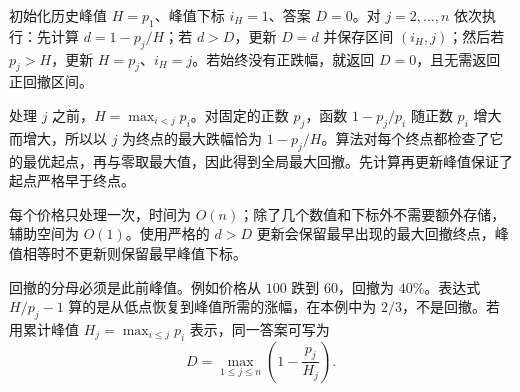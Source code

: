 初始化历史峰值 $H=p_1$、峰值下标 $i_H=1$、答案 $D=0$。对 $j=2,\ldots,n$ 依次执行：先计算 $d=1-p_j/H$；若 $d>D$，更新 $D=d$ 并保存区间 $(i_H,j)$；然后若 $p_j>H$，更新 $H=p_j$、$i_H=j$。若始终没有正跌幅，就返回 $D=0$，且无需返回正回撤区间。

处理 $j$ 之前，$H=\max_{i<j}p_i$。对固定的正数 $p_j$，函数 $1-p_j/p_i$ 随正数 $p_i$ 增大而增大，所以以 $j$ 为终点的最大跌幅恰为 $1-p_j/H$。算法对每个终点都检查了它的最优起点，再与零取最大值，因此得到全局最大回撤。先计算再更新峰值保证了起点严格早于终点。

每个价格只处理一次，时间为 $O(n)$；除了几个数值和下标外不需要额外存储，辅助空间为 $O(1)$。使用严格的 $d>D$ 更新会保留最早出现的最大回撤终点，峰值相等时不更新则保留最早峰值下标。

回撤的分母必须是此前峰值。例如价格从 $100$ 跌到 $60$，回撤为 $40\%$。表达式 $H/p_j-1$ 算的是从低点恢复到峰值所需的涨幅，在本例中为 $2/3$，不是回撤。若用累计峰值 $H_j=\max_{i\le j}p_i$ 表示，同一答案可写为
\[
 \boxed{D=\max_{1\le j\le n}\left(1-\frac{p_j}{H_j}\right)}.
\]
